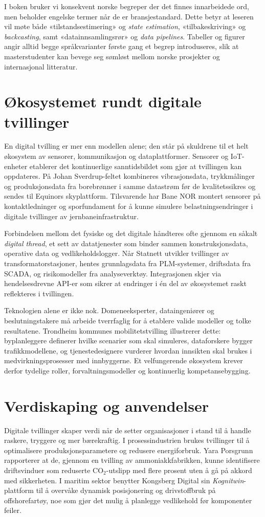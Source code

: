 I boken bruker vi konsekvent norske begreper der det finnes innarbeidede ord, men beholder engelske termer når de er bransjestandard. Dette betyr at leseren vil møte både «tilstandsestimering» og \emph{state estimation}, «tilbakeskriving» og \emph{backcasting}, samt «datainnsamlingsrør» og \emph{data pipelines}. Tabeller og figurer angir alltid begge språkvarianter første gang et begrep introduseres, slik at masterstudenter kan bevege seg sømløst mellom norske prosjekter og internasjonal litteratur.

\section{Økosystemet rundt digitale tvillinger}
En digital tvilling er mer enn modellen alene; den står på skuldrene til et helt økosystem av sensorer, kommunikasjon og dataplattformer. Sensorer og IoT-enheter etablerer det kontinuerlige sanntidsbildet som gjør at tvillingen kan oppdateres. På Johan Sverdrup-feltet kombineres vibrasjonsdata, trykkmålinger og produksjonsdata fra borebrønner i samme datastrøm før de kvalitetssikres og sendes til Equinors skyplattform. Tilsvarende har Bane NOR montert sensorer på kontaktledninger og sporfundament for å kunne simulere belastningsendringer i digitale tvillinger av jernbaneinfrastruktur.

Forbindelsen mellom det fysiske og det digitale håndteres ofte gjennom en såkalt \emph{digital thread}, et sett av datatjenester som binder sammen konstruksjonsdata, operative data og vedlikeholdslogger. Når Statnett utvikler tvillinger av transformatorstasjoner, hentes grunnlagsdata fra PLM-systemer, driftsdata fra SCADA, og risikomodeller fra analyseverktøy. Integrasjonen skjer via hendelsesdrevne API-er som sikrer at endringer i én del av økosystemet raskt reflekteres i tvillingen.

Teknologien alene er ikke nok. Domeneeksperter, dataingeniører og beslutningstakere må arbeide tverrfaglig for å etablere valide modeller og tolke resultatene. Trondheim kommunes mobilitetstvilling illustrerer dette: byplanleggere definerer hvilke scenarier som skal simuleres, dataforskere bygger trafikkmodellene, og tjenestedesignere vurderer hvordan innsikten skal brukes i medvirkningsprosesser med innbyggerne. Et velfungerende økosystem krever derfor tydelige roller, forvaltningsmodeller og kontinuerlig kompetansebygging.

\section{Verdiskaping og anvendelser}
Digitale tvillinger skaper verdi når de setter organisasjoner i stand til å handle raskere, tryggere og mer bærekraftig. I prosessindustrien brukes tvillinger til å optimalisere produksjonsparametere og redusere energiforbruk. Yara Porsgrunn rapporterer at de, gjennom en tvilling av ammoniakkfabrikken, kunne identifisere driftsvinduer som reduserte CO$_2$-utslipp med flere prosent uten å gå på akkord med sikkerheten. I maritim sektor benytter Kongsberg Digital sin \emph{Kognitwin}-plattform til å overvåke dynamisk posisjonering og drivstoffbruk på offshorefartøy, noe som gjør det mulig å planlegge vedlikehold før komponenter feiler.


